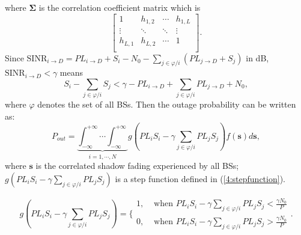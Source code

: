  where $\mathbf{\Sigma}$ is the correlation coefficient matrix which is
 \begin{equation}
 \left[\begin{array}{cccc}
 1 & h_{1,2} & \cdots & h_{1,L}\\
 \vdots & \ddots & \ddots & \vdots\\
 h_{L,1} & h_{L,2} & \cdots & 1\\
 \end{array}\right].
 \end{equation}
 Since $\text{SINR}_{i\to D}=PL_{i\to D}+S_{i}-N_{0}-\sum_{j\in\varphi/i}(PL_{j\to D} + S_{j})$ in dB, $\text{SINR}_{i\to D}<\gamma$ means
 \begin{equation}
 S_{i} - \sum_{j\in\varphi/i}S_{j}<\gamma -PL_{i\to D} + \sum_{j\in\varphi/i}PL_{j\to D} + N_{0},
 \end{equation}
 where $\varphi$ denotes the set of all BSs.
 Then the outage probability can be written as:
 \begin{equation}
 \label{4:outprob}
 P_{out} = \underbrace{\int_{-\infty}^{+\infty}\cdots\int_{-\infty}^{+\infty}}_{i =1,\cdots,N} g(PL_{i}S_{i} - \gamma\sum_{j\in\varphi/i}PL_{j}S_{j})f(\mathbf{s})d\mathbf{s},
 \end{equation}
 where $\mathbf{s}$ is the correlated shadow fading experienced by all BSs; $g(PL_{i}S_{i} - \gamma\sum_{j\in\varphi/i}PL_{j}S_{j})$ is a step function defined in (\ref{4:stepfunction}). 

 \begin{equation}
 \label{4:stepfunction}
 g(PL_{i}S_{i} - \gamma\sum_{j\in\varphi/i}PL_{j}S_{j}) = \{\begin{array}{cc}
                1, &  \text{  when }PL_{i}S_{i} - \gamma\sum_{j\in\varphi/i}PL_{j}S_{j} <\frac{\gamma N_{0}}{P}\\
                0, & \text{  when }PL_{i}S_{i} - \gamma\sum_{j\in\varphi/i}PL_{j}S_{j} >\frac{\gamma N_{0}}{P}
              \end{array}.
 \end{equation}

